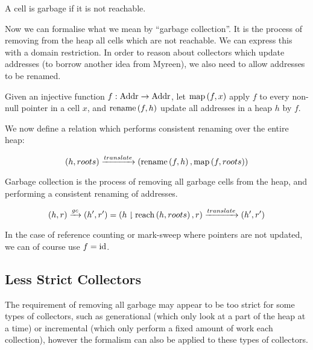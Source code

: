 \begin{definition}[Garbage]
  A cell is garbage if it is not reachable.

  \begin{prooftree}
  \end{prooftree}
\end{definition}

Now we can formalise what we mean by ``\gls{garbage collection}''. It
is the process of removing from the heap all \glspl{cell} which are
not reachable. We can express this with a domain
restriction. In order to reason about \glspl{collector} which update
addresses (to borrow another idea from Myreen), we also need to allow
addresses to be renamed.

\begin{definition}[Translation]
  Given an injective function $f : \addr \to \addr$, let $\map{f}{x}$
  apply $f$ to every non-null pointer in a cell $x$, and
  $\rename{f}{h}$ update all addresses in a heap $h$ by $f$.

  We now define a relation which performs consistent renaming over the
  entire heap:

  \[(h, roots) \translate \left(\rename{f}{h}, \map{f}{roots}\right)\]
\end{definition}

\begin{definition}
  Garbage collection is the process of removing all garbage cells from
  the heap, and performing a consistent renaming of addresses.

  \[(h, r) \gc (h', r') = (h \restrict \reach{h}{roots}, r) \translate
  (h', r')\]
\end{definition}

In the case of \gls{reference counting} or \gls{mark-sweep} where
\glspl{pointer} are not updated, we can of course use $f = \id$.

\subsection{Less Strict Collectors}

The requirement of removing all \gls{garbage} may appear to be too
strict for some types of collectors, such as generational (which only
look at a part of the heap at a time) or incremental (which only
perform a fixed amount of work each collection), however the formalism
can also be applied to these types of collectors.

